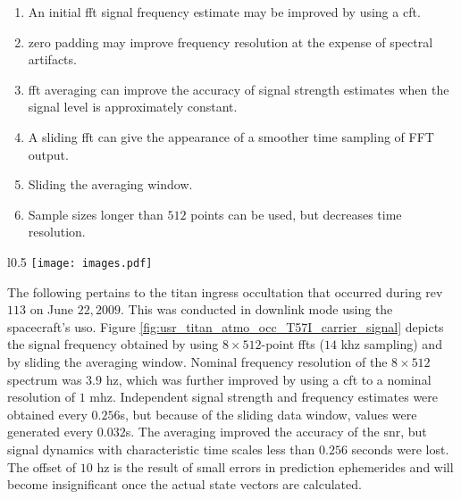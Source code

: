 \documentclass{article}
\begin{document}
            \begin{enumerate}
            \item An initial \gls{fft} signal frequency estimate may be improved by using a \gls{cft}.
            \item \Gls{zero padding} may improve frequency resolution at the expense of spectral artifacts.
            \item \gls{fft averaging} can improve the accuracy of signal strength estimates when the signal level is approximately constant.
            \item A \gls{sliding fft} can give the appearance of a smoother time sampling of FFT output. 
            \item Sliding the averaging window.
            \item Sample sizes longer than $512$ points can be used, but decreases time \gls{resolution}. 
            \end{enumerate}
            \par
            \begin{wrapfigure}[14]{l}{0.5\textwidth}
            	\centering
                \vspace{-5ex}
            	\texttt{[image: images.pdf]}
            	\caption{T57I Carrier Frequency Output of X-Band RSR}
            	\label{fig:usr_titan_atmo_occ_T57I_carrier_signal}
            \end{wrapfigure}
            The following pertains to the \gls{titan} \gls{ingress} \gls{occultation} that occurred during \gls{rev} $113$ on June $22, 2009$. This was conducted in  \gls{downlink} mode using the spacecraft's \gls{uso}. Figure \ref{fig:usr_titan_atmo_occ_T57I_carrier_signal} depicts the signal frequency obtained by using $8\times 512$-point \glspl{fft} ($14$ \gls{khz} sampling) and by sliding the averaging window. Nominal \gls{frequency} \gls{resolution} of the $8\times 512$ spectrum was $3.9$ \gls{hz}, which was further improved by using a \gls{cft} to a nominal \gls{resolution} of $1$ \gls{mhz}. Independent signal strength and \gls{frequency} estimates were obtained every $0.256$s, but because of the sliding data window, values were generated every $0.032$s. The averaging improved the accuracy of the \gls{snr}, but signal dynamics with characteristic time scales less than $0.256$ seconds were lost. The offset of $10$ \gls{hz} is the result of small errors in prediction ephemerides and will become insignificant once the actual state vectors are calculated.
\end{document}
